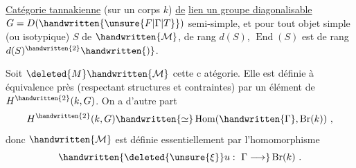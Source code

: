 \uline{Catégorie tannakienne} (sur un corps $k$) \uline{de}  \uline{lien un groupe diagonalisable} $G=D(\handwritten{\unsure{F|\Gamma|T}})$  semi-simple, et pour tout objet simple (ou isotypique) $S$ de $\handwritten{\mathcal{M}}$, de rang $d(S)$, $\operatorname{End}(S)$ est de rang $d(S)^{\handwritten{2}}\handwritten{)}$.

Soit $\deleted{M}\handwritten{\mathcal{M}}$ cette c atégorie. Elle est définie à équivalence près (respectant structures et contraintes) par un élément de $H^{\handwritten{2}}(k,G)$. On a d'autre part
\[
H^{\handwritten{2}}(k,G)\handwritten{\simeq}\operatorname{Hom}(\handwritten{\Gamma},\operatorname{Br}(k))\ ,
\]
donc $\handwritten{\mathcal{M}}$ est définie essentiellement par l'homomorphisme 
\[
\handwritten{\deleted{\unsure{\xi}}u:\ \Gamma\longrightarrow}\operatorname{Br}(k)\ .
\]

